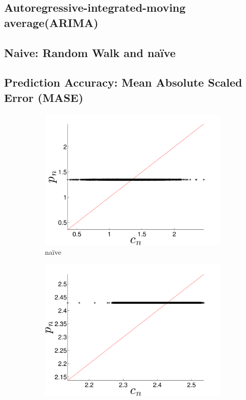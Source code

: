 \subsection{Autoregressive-integrated-moving average(ARIMA)}
\subsection{Naive: Random Walk and na\"ive}
\subsection{Prediction Accuracy: Mean Absolute Scaled Error (MASE)}
\label{sec:accuracy}

\begin{figure}[htbp]
  \centering
   \begin{subfigure}{0.49\textwidth}
    \includegraphics[width=\textwidth]{figs/gccMeanForecast}
    \caption{\gcc na\"ive }
    \label{fig:gccMEAN}
  \end{subfigure}%
     \begin{subfigure}{0.49\textwidth}
    \includegraphics[width=\textwidth]{figs/colMeanForecast}

\end{subfigure}
\end{figure}
